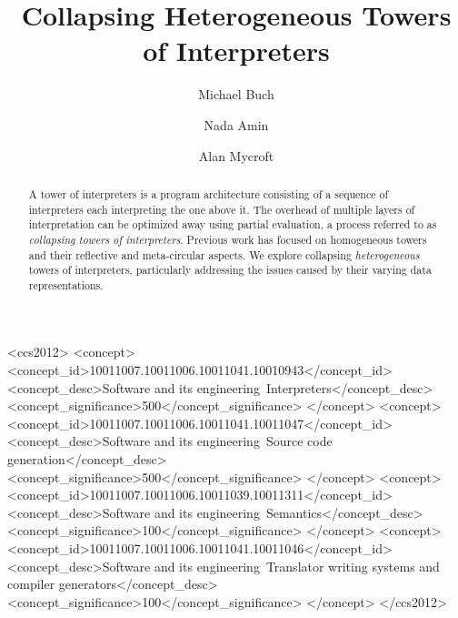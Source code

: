 \documentclass[sigplan,anonymous,review]{acmart}
\theoremstyle{definition}
\begin{document}
\title{Collapsing Heterogeneous Towers of Interpreters}

\author{Michael Buch}

\author{Nada Amin}

\author{Alan Mycroft}

\renewcommand{\shortauthors}{Buch and Amin, et al.}

\begin{abstract}
A tower of interpreters is a program architecture consisting of a sequence of interpreters each interpreting the one above it. The overhead of multiple layers of interpretation can be optimized away using partial evaluation, a process referred to as \textit{collapsing towers of interpreters}.
Previous work has focused on homogeneous towers and their reflective and meta-circular aspects. We explore collapsing \textit{heterogeneous} towers of interpreters, particularly addressing the issues caused by their varying data representations.
\end{abstract}

\begin{CCSXML}
<ccs2012>
<concept>
<concept_id>10011007.10011006.10011041.10010943</concept_id>
<concept_desc>Software and its engineering~Interpreters</concept_desc>
<concept_significance>500</concept_significance>
</concept>
<concept>
<concept_id>10011007.10011006.10011041.10011047</concept_id>
<concept_desc>Software and its engineering~Source code generation</concept_desc>
<concept_significance>500</concept_significance>
</concept>
<concept>
<concept_id>10011007.10011006.10011039.10011311</concept_id>
<concept_desc>Software and its engineering~Semantics</concept_desc>
<concept_significance>100</concept_significance>
</concept>
<concept>
<concept_id>10011007.10011006.10011041.10011046</concept_id>
<concept_desc>Software and its engineering~Translator writing systems and compiler generators</concept_desc>
<concept_significance>100</concept_significance>
</concept>
</ccs2012>
\end{CCSXML}
\end{document}
